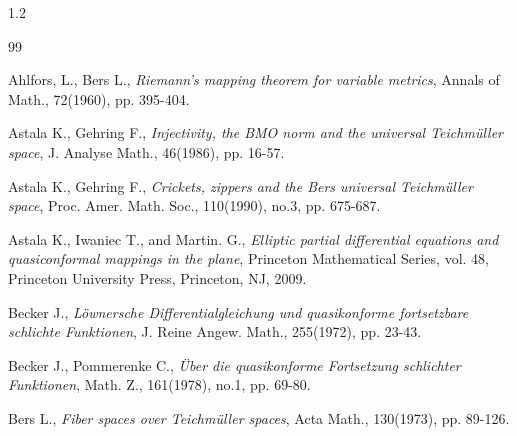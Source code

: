 \documentclass[11pt]{amsart}
\theoremstyle{remark}
\theoremstyle{claim}
\theoremstyle{definition}
\theoremstyle{problem}
\theoremstyle{conjecture}
\theoremstyle{question}
\numberwithin{equation}{section}
\begin{document}
 \begin{spacing}{1.2} %

\begin{thebibliography}{99}

Ahlfors, L., Bers L., {\em Riemann’s mapping theorem for variable metrics},  Annals of Math., 72(1960), pp. 395-404.

Astala K., Gehring F., {\em Injectivity, the BMO norm and the universal Teichm\"uller space}, J. Analyse Math., 46(1986), pp. 16-57.

Astala K., Gehring F., {\em Crickets, zippers and the Bers universal Teichm\"uller space}, Proc. Amer. Math. Soc., 110(1990), no.3, pp. 675-687.


 
 Astala K., Iwaniec T., and Martin. G., {\em Elliptic partial differential equations and 
quasiconformal mappings in the plane}, Princeton Mathematical Series, vol. 48, Princeton University Press, Princeton, NJ, 2009.
 
Becker J., {\em L\"ownersche Differentialgleichung und quasikonforme fortsetzbare schlichte Funktionen}, J. Reine Angew. Math.,  255(1972), pp. 23-43.

 Becker J., Pommerenke C., {\em \"Uber die quasikonforme Fortsetzung schlichter Funktionen},  Math. Z.,  161(1978), no.1, pp. 69-80.

 Bers L., {\em Fiber spaces over Teichm\"uller spaces}, Acta Math., 130(1973), pp. 89-126.






\end{thebibliography}
\end{spacing}
\end{document}
